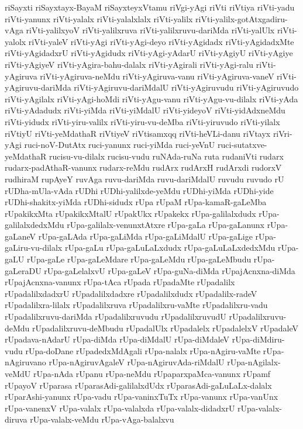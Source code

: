 {riSayxti
riSayxtayx-BayaM
riSayxteyxVtamu
riVgi-yAgi
riVti
riVtiya
riVti-yadu
riVti-yanunx
riVti-yalalx
riVti-yalalxlalx
riVti-yalilx
riVti-yalilx-gotAtxgadiru-vAga
riVti-yalilxyoV
riVti-yalilxruva
riVti-yalilxruvu-dariMda
riVti-yalUlx
riVti-yalolx
riVti-yaleV
riVti-yAgi
riVti-yAgi-deyo
riVti-yAgidadx
riVti-yAgidadxMte
riVti-yAgidadxrU
riVti-yAgidudx
riVti-yAgi-yAdarU
riVti-yAgiyU
riVti-yAgiye
riVti-yAgiyeV
riVti-yAgira-bahu-dalalx
riVti-yAgirali
riVti-yAgi-ralu
riVti-yAgiruva
riVti-yAgiruva-neMdu
riVti-yAgiruva-vanu
riVti-yAgiruva-vaneV
riVti-yAgiruvu-dariMda
riVti-yAgiruvu-dariMdalU
riVti-yAgiruvudu
riVti-yAgiruvudo
riVti-yAgilalx
riVti-yAgi-hoMdi
riVti-yAgu-vanu
riVti-yAgu-vu-dilalx
riVti-yAda
riVti-yAdadudx
riVti-yiMda
riVti-yiMdalU
riVti-yideyoV
riVti-yidAdxneMdu
riVti-yidudx
riVti-yiru-valilx
riVti-yiru-vu-deMba
riVti-yiruvudo
riVti-yilalx
riVtiyU
riVti-yeMdathaR
riVtiyeV
riVtisamxqq
riVti-heVLi-danu
riVtayx
riVri-yAgi
ruci-noV-DutAtx
ruci-yanunx
ruci-yiMda
ruci-yeVnU
ruci-sutatxve-yeMdathaR
rucisu-vu-dilalx
rucisu-vudu
ruNAda-ruNa
ruta
rudaniVti
rudarx
rudarx-padAthaR-vanunx
rudarx-reMdu
rudArx
rudArxH
rudArxdi
rudorxV
rudhiraM
rupAyeY
ruvAga
ruvu-dariMda
ruvu-dariMdalU
ruvudu
ruvudo
rU
rUDha-mUla-vAda
rUDhi
rUDhi-yalilxde-yeMdu
rUDhi-yiMda
rUDhi-yide
rUDhi-shakitx-yiMda
rUDhi-sidudx
rUpa
rUpaM
rUpa-kamaR-gaLeMba
rUpakikxMta
rUpakikxMtalU
rUpakUkx
rUpakekx
rUpa-galilalxdudx
rUpa-galilalxdedxMdu
rUpa-galilalx-venunxtAtxre
rUpa-gaLa
rUpa-gaLanunx
rUpa-gaLaneV
rUpa-gaLAda
rUpa-gaLiMda
rUpa-gaLiMdalU
rUpa-gaLige
rUpa-gaLiru-vu-dilalx
rUpa-gaLu
rUpa-gaLuLaLxdudx
rUpa-gaLuLaLxdedxMdu
rUpa-gaLU
rUpa-gaLe
rUpa-gaLeMdare
rUpa-gaLeMdu
rUpa-gaLeMbudu
rUpa-gaLeraDU
rUpa-gaLelalxvU
rUpa-gaLeV
rUpa-guNa-diMda
rUpajAcnxna-diMda
rUpajAcnxna-vanunx
rUpa-tAca
rUpada
rUpadaMte
rUpadalilx
rUpadalilxdadxrU
rUpadalilxdadxre
rUpadalilxdudx
rUpadalilx-radeV
rUpadalilxra-lilalx
rUpadalilxruva
rUpadalilxru-vaMte
rUpadalilxru-vadu
rUpadalilxruvu-dariMda
rUpadalilxruvudu
rUpadalilxruvudU
rUpadalilxruvu-deMdu
rUpadalilxruvu-deMbudu
rUpadalUlx
rUpadalelx
rUpadalelxV
rUpadaleV
rUpadava-nAdarU
rUpa-diMda
rUpa-diMdalU
rUpa-diMdaleV
rUpa-diMdiru-vudu
rUpa-doDane
rUpadedxMdAgali
rUpa-nalalx
rUpa-nAgiru-vaMte
rUpa-nAgiruvano
rUpa-nAgiruvAgaleV
rUpa-nAgiruvAda-riMdalU
rUpa-nAgilalx-veMdU
rUpa-nAda
rUpanu
rUpa-neMdu
rUpaparxpaMca-vanunx
rUpamf
rUpayoV
rUparasa
rUparasAdi-galilalxdUdx
rUparasAdi-gaLuLaLx-dalalx
rUparAshi-yanunx
rUpa-vadu
rUpa-vaninxTuTx
rUpa-vanunx
rUpa-vanUnx
rUpa-vanenxV
rUpa-valalx
rUpa-valalxda
rUpa-valalx-didadxrU
rUpa-valalx-diruva
rUpa-valalx-veMdu
rUpa-vAga-balalxvu
}
